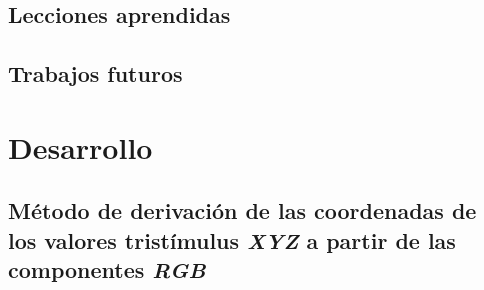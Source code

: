 \documentclass[a4paper, 12pt]{report}
\begin{document}
\section{Lecciones aprendidas}
\label{sec:lecciones_aprendidas}

\section{Trabajos futuros}
\label{sec:trabajos_futuros}



\cleardoublepage
\appendix

\chapter{Desarrollo}
\section{Método de derivación de las coordenadas de los valores tristímulus \textit{XYZ} a partir de las componentes \textit{RGB}}
\label{sec:rgb_to_xyz}
\end{document}
